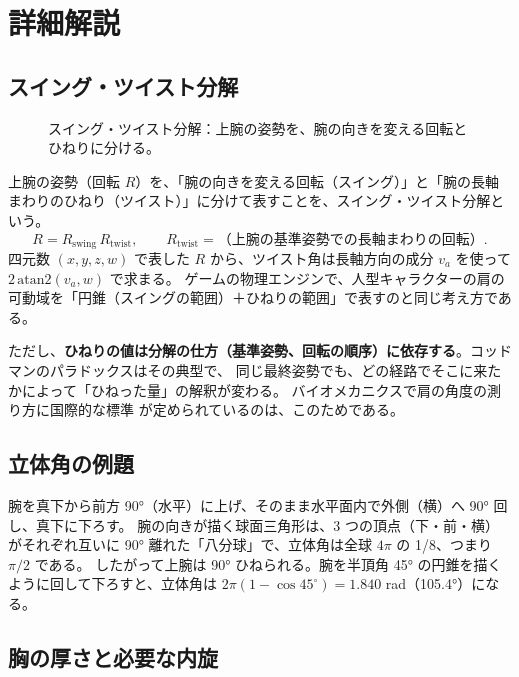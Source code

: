 \section{詳細解説}

\subsection{スイング・ツイスト分解}

\begin{figure}[htbp]\centering
\resizebox{0.9\linewidth}{!}{}
\caption{スイング・ツイスト分解：上腕の姿勢を、腕の向きを変える回転とひねりに分ける。}\label{fig:tikz-swingtwist}
\end{figure}

上腕の姿勢（回転 $R$）を、「腕の向きを変える回転（スイング）」と「腕の長軸まわりのひねり（ツイスト）」に分けて表すことを、スイング・ツイスト分解という。
\begin{equation}
R = R_{\text{swing}}\,R_{\text{twist}},\qquad R_{\text{twist}}=\text{（上腕の基準姿勢での長軸まわりの回転）}.
\end{equation}
四元数 $(x,y,z,w)$ で表した $R$ から、ツイスト角は長軸方向の成分 $v_a$ を使って $2\,\mathrm{atan2}(v_a, w)$ で求まる。
ゲームの物理エンジンで、人型キャラクターの肩の可動域を「円錐（スイングの範囲）＋ひねりの範囲」で表すのと同じ考え方である。

ただし、\textbf{ひねりの値は分解の仕方（基準姿勢、回転の順序）に依存する}。コッドマンのパラドックスはその典型で、
同じ最終姿勢でも、どの経路でそこに来たかによって「ひねった量」の解釈が変わる。
バイオメカニクスで肩の角度の測り方に国際的な標準 \cite{R36} が定められているのは、このためである。

\subsection{立体角の例題}

\begin{example}
腕を真下から前方 90°（水平）に上げ、そのまま水平面内で外側（横）へ 90° 回し、真下に下ろす。
腕の向きが描く球面三角形は、3 つの頂点（下・前・横）がそれぞれ互いに 90° 離れた「八分球」で、立体角は全球 $4\pi$ の 1/8、つまり $\pi/2$ である。
したがって上腕は 90° ひねられる。腕を半頂角 45° の円錐を描くように回して下ろすと、立体角は $2\pi(1-\cos45^\circ) = 1.840$ rad（105.4°）になる。
\end{example}

\subsection{胸の厚さと必要な内旋}

